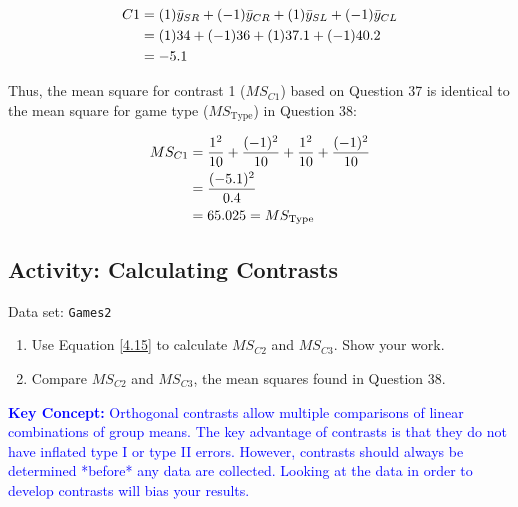 \documentclass[
]{book}
\providecommand{\tightlist}{%
  \setlength{\itemsep}{0pt}\setlength{\parskip}{0pt}}
\begin{document}
\begin{align}
C1 &= (1)\bar{y}_{SR} + (-1)\bar{y}_{CR} + (1)\bar{y}_{SL} + (-1)\bar{y}_{CL} \notag \\
   &= (1)34 + (-1)36 + (1)37.1 + (-1)40.2 \notag \\
   &= -5.1 \notag
\end{align}

Thus, the mean square for contrast 1 (\(MS_{C1}\)) based on Question 37 is identical to the mean square for game type (\(MS_{\text{Type}}\)) in Question 38:

\begin{align}
MS_{C1} &= \frac{1^2}{10} + \frac{(-1)^2}{10} + \frac{1^2}{10} + \frac{(-1)^2}{10} \notag \\
        &= \frac{(-5.1)^2}{0.4} \notag \\
        &= 65.025 = MS_{\text{Type}} \notag
\end{align}

\hypertarget{activity-calculating-contrasts}{%
\subsection*{Activity: Calculating Contrasts}\label{activity-calculating-contrasts}}

Data set: \texttt{Games2}

\begin{enumerate}
\def\labelenumi{\arabic{enumi}.}
\setcounter{enumi}{39}
\tightlist
\item
  Use Equation \ref{4.15} to calculate \(MS_{C2}\) and \(MS_{C3}\). Show your work.
\item
  Compare \(MS_{C2}\) and \(MS_{C3}\), the mean squares found in Question 38.
\end{enumerate}

\textbf{\textcolor{blue}{Key Concept:}}
\textcolor{blue}{Orthogonal contrasts allow multiple comparisons of linear combinations of group means. The key advantage of contrasts is that they do not have inflated type I or type II errors. However, contrasts should always be determined *before* any data are collected. Looking at the data in order to develop contrasts will bias your results.}
\end{document}
